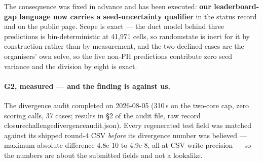 \documentclass[11pt,a4paper]{article}
\newcommand{\breakus}{\textunderscore\allowbreak}
\newcommand{\code}[1]{{\small\ttfamily\let\_\breakus #1}}
\newcommand{\artifact}[1]{{\footnotesize\ttfamily\let\_\breakus #1}}
\begin{document}
The consequence was fixed in advance and has been executed: \textbf{our leaderboard-gap
language now carries a seed-uncertainty qualifier} in the status record and on the public
page. Scope is exact --- the duct model behind three predictions is bin-deterministic at
41{,}971 cells, so \code{random\_state} is inert for it by construction rather than by
measurement, and the two declined cases are the organisers' own solve, so the five non-PH
predictions contribute zero seed variance and the division by eight is exact.

\paragraph{G2, measured --- and the finding is against us.} The divergence audit completed
on 2026-08-05 (310\,s on the two-core cap, zero scoring calls, 37 cases; results in \S2 of
the audit file, raw record
\artifact{closure\_challenge\_divergence\_audit.json}). Every
regenerated test field was matched against its shipped round-4 CSV \emph{before} its
divergence number was believed --- maximum absolute difference 4.8e-10 to 4.9e-8, all at CSV
write precision --- so the numbers are about the submitted fields and not a lookalike.
\end{document}
